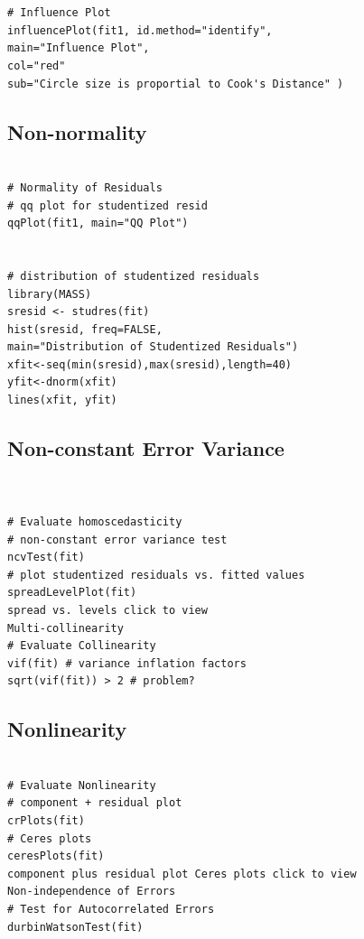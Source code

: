 \documentclass[residuals.tex]{subfiles}
\begin{document}
\begin{framed}
	\begin{verbatim}


# Influence Plot 
influencePlot(fit1,	id.method="identify", 
main="Influence Plot", 
col="red"
sub="Circle size is proportial to Cook's Distance" )

\end{verbatim}
\end{framed}
\subsection*{Non-normality}

\begin{framed}
\begin{verbatim}

# Normality of Residuals
# qq plot for studentized resid
qqPlot(fit1, main="QQ Plot")


# distribution of studentized residuals
library(MASS)
sresid <- studres(fit) 
hist(sresid, freq=FALSE, 
main="Distribution of Studentized Residuals")
xfit<-seq(min(sresid),max(sresid),length=40) 
yfit<-dnorm(xfit) 
lines(xfit, yfit)
\end{verbatim}
\end{framed}
\subsection*{Non-constant Error Variance}
\begin{framed}
\begin{verbatim}	


# Evaluate homoscedasticity
# non-constant error variance test
ncvTest(fit)
# plot studentized residuals vs. fitted values 
spreadLevelPlot(fit)
spread vs. levels click to view
Multi-collinearity
# Evaluate Collinearity
vif(fit) # variance inflation factors 
sqrt(vif(fit)) > 2 # problem?
\end{verbatim}
\end{framed}
\subsection{Nonlinearity}
\begin{framed}
\begin{verbatim}	
	
# Evaluate Nonlinearity
# component + residual plot 
crPlots(fit)
# Ceres plots 
ceresPlots(fit)
component plus residual plot Ceres plots click to view
Non-independence of Errors
# Test for Autocorrelated Errors
durbinWatsonTest(fit)
\end{verbatim}
\end{framed}
\end{document}
